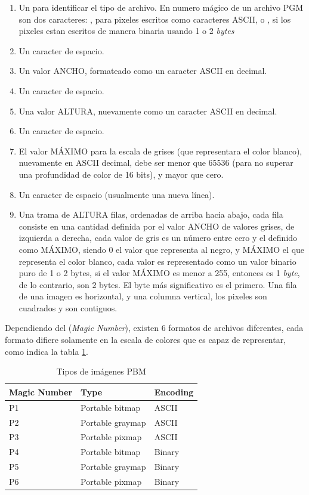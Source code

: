 \begin{enumerate}
	\item Un  para identificar el tipo de archivo. En numero mágico de un archivo PGM son dos caracteres: , para pixeles escritos como caracteres ASCII, o , si los pixeles estan escritos de manera binaria usando 1 o 2 \emph{bytes}
	\item Un caracter de espacio.
	\item Un valor ANCHO, formateado como un caracter ASCII en decimal.
	\item Un caracter de espacio.
	\item Una valor ALTURA, nuevamente como un caracter ASCII en decimal.
	\item Un caracter de espacio.
	\item El valor MÁXIMO para la escala de grises (que representara el color blanco), nuevamente en ASCII decimal, debe ser menor que 65536 (para no superar una profundidad de color de 16 bits), y mayor que cero.
	\item Un caracter de espacio (usualmente una nueva línea).
	\item Una trama de ALTURA filas, ordenadas de arriba hacia abajo, cada fila consiste en una cantidad definida por el valor ANCHO de valores grises, de izquierda a derecha, cada valor de gris es un número entre cero y el definido como MÁXIMO, siendo $0$ el valor que representa al negro, y MÁXIMO el que representa el color blanco, cada valor es representado como un valor binario puro de 1 o 2 bytes, si el valor MÁXIMO es menor a 255, entonces es 1 \emph{byte}, de lo contrario, son 2 bytes. El byte más significativo es el primero.
	Una fila de una imagen es horizontal, y una columna vertical, los pixeles son cuadrados y son contiguos.
\end{enumerate}

Dependiendo del  (\emph{Magic Number}), existen 6 formatos de archivos diferentes, cada formato difiere solamente en la escala de colores que es capaz de representar, como indica la tabla \ref{ch:implementacion:tabla:tiposdearchivospbm}.

\begin{table}[h]
	\centering
	\begin{tabular}{|l|l|l|}
		\hline
		Magic Number	&	Type				&	Encoding\\ \hline
		P1				&	Portable bitmap		&	ASCII \\ \hline
		P2				&	Portable graymap	&	ASCII \\ \hline
		P3				&	Portable pixmap		&	ASCII \\ \hline
		P4				&	Portable bitmap		&	Binary \\ \hline
		P5				&	Portable graymap	&	Binary \\ \hline
		P6				&	Portable pixmap		&	Binary \\ \hline
	\end{tabular}
	\caption{Tipos de imágenes PBM}
	\label{ch:implementacion:tabla:tiposdearchivospbm}
\end{table}

